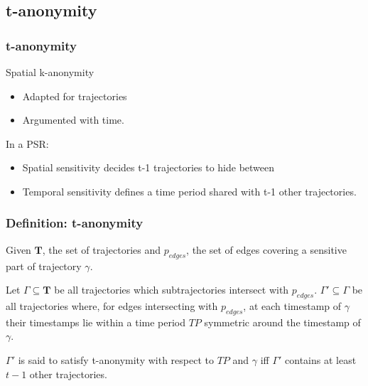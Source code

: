\subsection{t-anonymity} 
\begin{frame}[red]
\frametitle{t-anonymity}

Spatial k-anonymity 
\begin{itemize}
\item Adapted for trajectories
\item Argumented with time.
\end{itemize}
\vspace{1em}

In a PSR:
\begin{itemize}
\item Spatial sensitivity decides t-1 trajectories to hide between
\item Temporal sensitivity defines a time period shared with t-1 other trajectories.
\end{itemize}
\end{frame}


\begin{frame}[red] %
\frametitle{Definition: t-anonymity}
\begin{definition}[t-anonymity]
Given $\mathbf{T}$, the set of trajectories and $p_{edges}$, the set of edges covering a sensitive part of trajectory $\gamma$. 

Let $\Gamma \subseteq \mathbf{T}$ be all trajectories which subtrajectories intersect with $p_{edges}$. $\Gamma' \subseteq \Gamma$ be all trajectories where, for edges intersecting with $p_{edges}$, at each timestamp of $\gamma$ their timestamps lie within a time period $TP$ symmetric around the timestamp of $\gamma$.

$\Gamma'$ is said to satisfy t-anonymity with respect to $TP$ and $\gamma$ iff $\Gamma'$ contains at least $t-1$ other trajectories.
\end{definition}
\end{frame}


